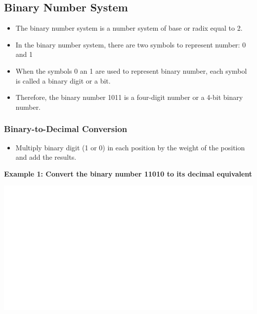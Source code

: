 \documentclass[]{book}
\providecommand{\tightlist}{%
  \setlength{\itemsep}{0pt}\setlength{\parskip}{0pt}}
\begin{document}
\hypertarget{binary-number-system}{%
\subsection{Binary Number System}\label{binary-number-system}}

\begin{itemize}
\tightlist
\item
  The binary number system is a number system of base or radix equal to 2.
\item
  In the binary number system, there are two symbols to represent number: 0 and 1
\item
  When the symbols 0 an 1 are used to represent binary number, each symbol is called a binary digit or a bit.
\item
  Therefore, the binary number 1011 is a four-digit number or a 4-bit binary number.
\end{itemize}

\hypertarget{binary-to-decimal-conversion}{%
\subsubsection{Binary-to-Decimal Conversion}\label{binary-to-decimal-conversion}}

\begin{itemize}
\tightlist
\item
  Multiply binary digit (1 or 0) in each position by the weight of the position and add the results.
\end{itemize}

\textbf{Example 1: Convert the binary number 11010 to its decimal equivalent}

\begin{center}\includegraphics[width=1\linewidth]{figure/NSbox2-1} \end{center}
\end{document}
